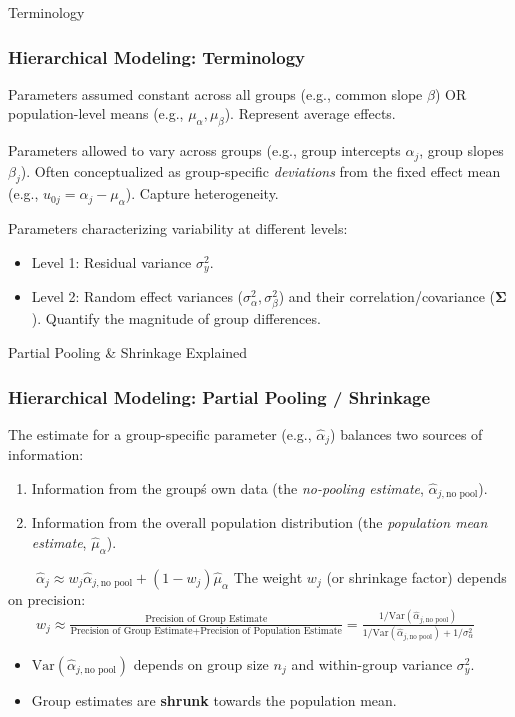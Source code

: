 \documentclass[aspectratio=169]{beamer}
\begin{document}
\begin{frame}{Terminology}
    \frametitle{Hierarchical Modeling: Terminology}
    \begin{description}[labelindent=1em,leftmargin=2em]
        \item[Fixed Effects] Parameters assumed constant across all groups (e.g., common slope $\beta$) OR population-level means (e.g., $\mu_{\alpha}, \mu_{\beta}$). Represent average effects.
        \pause
        \item[Random Effects] Parameters allowed to vary across groups (e.g., group intercepts $\alpha_j$, group slopes $\beta_j$). Often conceptualized as group-specific \emph{deviations} from the fixed effect mean (e.g., $u_{0j} = \alpha_j - \mu_{\alpha}$). Capture heterogeneity.
        \pause
        \item[Variance Components] Parameters characterizing variability at different levels:
        \begin{itemize}
            \item Level 1: Residual variance $\sigma^2_y$.
            \item Level 2: Random effect variances ($\sigma^2_{\alpha}, \sigma^2_{\beta}$) and their correlation/covariance ($\mathbf{\Sigma}$). Quantify the magnitude of group differences.
        \end{itemize}
    \end{description}
\end{frame}

\begin{frame}{Partial Pooling \& Shrinkage Explained}
    \frametitle{Hierarchical Modeling: Partial Pooling / Shrinkage}
    The estimate for a group-specific parameter (e.g., $\hat{\alpha}_j$) balances two sources of information:
    \pause
    \begin{enumerate}
        \item Information from the group\'s own data (the \emph{no-pooling estimate}, $\hat{\alpha}_{j, \text{no pool}}$).
        \item Information from the overall population distribution (the \emph{population mean estimate}, $\hat{\mu}_{\alpha}$).
    \end{enumerate}
    \pause
    $ \qquad \hat{\alpha}_j \approx w_j \hat{\alpha}_{j, \text{no pool}} + (1-w_j) \hat{\mu}_{\alpha} $
    \pause
    The weight $w_j$ (or shrinkage factor) depends on precision:
    \pause
    $ \qquad w_j \approx \frac{\text{Precision of Group Estimate}}{\text{Precision of Group Estimate} + \text{Precision of Population Estimate}} = \frac{1 / \text{Var}(\hat{\alpha}_{j, \text{no pool}})}{1 / \text{Var}(\hat{\alpha}_{j, \text{no pool}}) + 1 / \sigma^2_{\alpha}} $
    \pause
    \begin{itemize}
        \item $\text{Var}(\hat{\alpha}_{j, \text{no pool}})$ depends on group size $n_j$ and within-group variance $\sigma^2_y$.
        \item Group estimates are \textbf{shrunk} towards the population mean.
    \end{itemize}
\end{frame}
\end{document}
